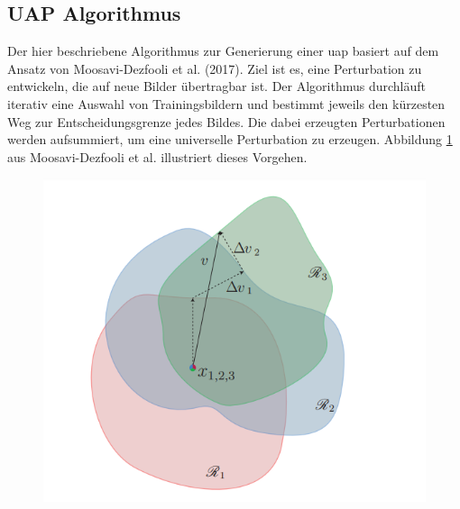 \subsection{UAP Algorithmus} \label{chap:UAP}
Der hier beschriebene Algorithmus zur Generierung einer \acrfull{uap} basiert auf dem Ansatz von Moosavi-Dezfooli et al. (2017). Ziel ist es, eine Perturbation zu entwickeln, die auf neue Bilder übertragbar ist. Der Algorithmus durchläuft iterativ eine Auswahl von Trainingsbildern und bestimmt jeweils den kürzesten Weg zur Entscheidungsgrenze jedes Bildes. Die dabei erzeugten Perturbationen werden aufsummiert, um eine universelle Perturbation zu erzeugen. Abbildung \ref{fig:uap-paper-figure2} aus Moosavi-Dezfooli et al. \cite{moosavi-dezfooli_universal_2017} illustriert dieses Vorgehen.

\begin{figure}[H]
    \begin{minipage}[b]{0.49\linewidth}
        \includegraphics[width=\linewidth]{01-images/04-methodik/UAP-figure2.png}
    \end{minipage}
    \hspace{0.01\linewidth} %
    \begin{minipage}[b]{0.49\linewidth}
        \label{fig:uap-paper-figure2}
    \end{minipage}
\end{figure}

